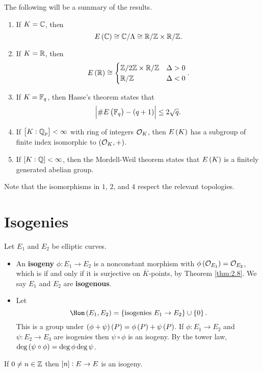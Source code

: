 The following will be a summary of the results.
\begin{enumerate}
\item If $ K = \mathbb{C} $, then
$$ E\br{\CC} \cong \CC / \Lambda \cong \RR / \ZZ \times \RR / \ZZ. $$
\item If $ K = \mathbb{R} $, then
$$ E\br{\RR} \cong
\begin{cases}
\ZZ / 2\ZZ \times \RR / \ZZ & \Delta > 0 \\
\RR / \ZZ & \Delta < 0
\end{cases}.
$$
\item If $ K = \mathbb{F}_q $, then Hasse's theorem states that
$$ \abs{\#E\br{\FF_q} - \br{q + 1}} \le 2\sqrt{q}. $$
\item If $ \sbr{K : \QQ_p} < \infty $ with ring of integers $ \mathcal{O}_K $, then $ E\br{K} $ has a subgroup of finite index isomorphic to $ \br{\OOO_K, +} $.
\item If $ \sbr{K : \QQ} < \infty $, then the Mordell-Weil theorem states that $ E\br{K} $ is a finitely generated abelian group.
\end{enumerate}
Note that the isomorphisms in $ 1 $, $ 2 $, and $ 4 $ respect the relevant topologies.

\pagebreak

\section{Isogenies}


\begin{definition*}
Let $ E_1 $ and $ E_2 $ be elliptic curves.
\begin{itemize}
\item An \textbf{isogeny} $ \phi : E_1 \to E_2 $ is a nonconstant morphism with $ \phi\br{\OOO_{E_1}} = \OOO_{E_2} $, which is if and only if it is surjective on $ \overline{K} $-points, by Theorem \ref{thm:2.8}. We say $ E_1 $ and $ E_2 $ are \textbf{isogenous}.
\item Let
$$ \Hom\br{E_1, E_2} = \cbr{\text{isogenies} \ E_1 \to E_2} \cup \cbr{0}. $$
This is a group under $ \br{\phi + \psi}\br{P} = \phi\br{P} + \psi\br{P} $. If $ \phi : E_1 \to E_2 $ and $ \psi : E_2 \to E_3 $ are isogenies then $ \psi \circ \phi $ is an isogeny. By the tower law, $ \deg \br{\psi \circ \phi} = \deg \phi\deg \psi $.
\end{itemize}
\end{definition*}

\begin{lemma}
If $ 0 \ne n \in \mathbb{Z} $ then $ \sbr{n} : E \to E $ is an isogeny.
\end{lemma}

